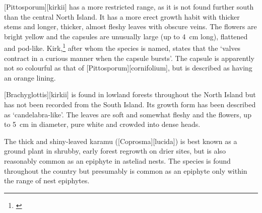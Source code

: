 [Pittosporum][kirkii] has a more restricted range, as it is not found further south than the central North Island.
It has a more erect growth habit with thicker stems and longer, thicker, almost fleshy leaves with obscure veins.
The flowers are bright yellow and the capsules are unusually large (up to \SI{4}{\centi\metre} long), flattened and pod-like.
Kirk,\footnote{\cite{kirk1869botany}} after whom the species is named, states that the `valves contract in a curious manner when the capsule bursts'.
The capsule is apparently not so colourful as that of [Pittosporum][cornifolium], but is described as having an orange lining.

[Brachyglottis][kirkii] is found in lowland forests throughout the North Island but has not been recorded from the South Island.
Its growth form has been described as `candelabra-like'.
The leaves are soft and somewhat fleshy and the flowers, up to \SI{5}{\centi\metre} in diameter, pure white and crowded into dense heads.

The thick and shiny-leaved karamu ([Coprosma][lucida]) is best known as a ground plant in shrubby, early forest regrowth on drier sites, but is also reasonably common as an epiphyte in asteliad nests.
The species is found throughout the country but presumably is common as an epiphyte only within the range of nest epiphytes.

